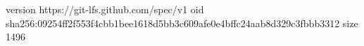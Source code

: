 version https://git-lfs.github.com/spec/v1
oid sha256:09254ff2f553f4cbb1bee1618d5bb3c609afe0e4bffc24aab8d329c3fbbb3312
size 1496

